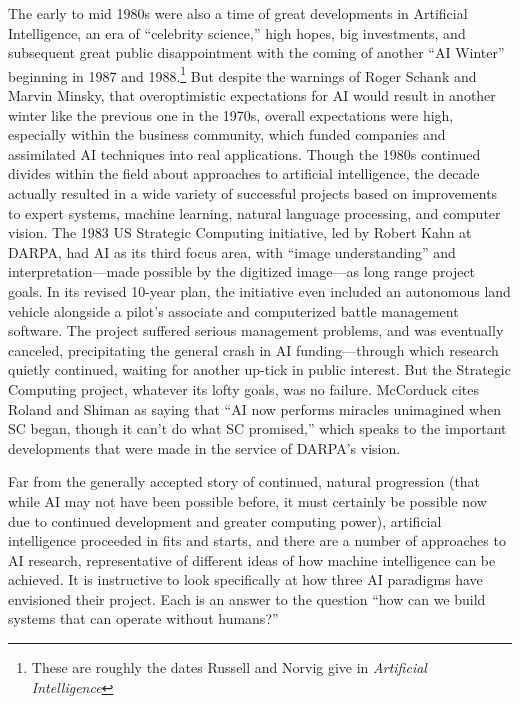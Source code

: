 The early to mid 1980s were also a time of great developments in
Artificial Intelligence, an era of ``celebrity science,'' high hopes,
big investments, and subsequent great public disappointment with the
coming of another ``AI Winter'' beginning in 1987 and
1988.\footnote{These are roughly the dates Russell and Norvig give in
  \emph{Artificial Intelligence}\cite{russellnorvig}} But despite the
warnings of Roger Schank and Marvin Minsky, that overoptimistic
expectations for AI would result in another winter like the previous
one in the 1970s, overall expectations were high, especially within
the business community, which funded companies and assimilated AI
techniques into real applications.\cite[Afterword]{mccorduck} Though
the 1980s continued divides 
within the field about approaches to artificial intelligence, the decade
actually resulted in a wide variety of successful projects based on
improvements to expert systems, machine learning, natural language
processing, and computer vision.\cite[Afterword]{mccorduck} The 1983 US Strategic Computing
initiative, led by Robert Kahn at DARPA, had AI as its third focus
area, with ``image understanding'' and interpretation---made possible by
the digitized image---as long range project goals. In its revised
10-year plan, the initiative even included an autonomous land vehicle
alongside a pilot's associate and computerized battle management
software. The project suffered serious management problems, and
was eventually canceled, precipitating the general crash in AI
funding---through which research quietly continued, waiting for another
up-tick in public interest. But the Strategic Computing project,
whatever its lofty goals, was no failure. McCorduck cites Roland and
Shiman as saying that ``AI now performs miracles unimagined when SC
began, though it can't do what SC promised,'' which speaks to the
important developments that were made in the service of DARPA's vision.\cite[Afterword]{mccorduck}


Far from the generally accepted story of continued, natural
progression (that while AI may not have been possible before, it must
certainly be possible now due to continued development and greater
computing power), artificial intelligence proceeded in fits and
starts, and there are a number of approaches to AI research,
representative of different
ideas of how machine intelligence can be achieved. It is instructive
to look specifically at how three AI paradigms have envisioned their project.
Each is an answer to the question ``how can we build systems that
can operate without humans?''

